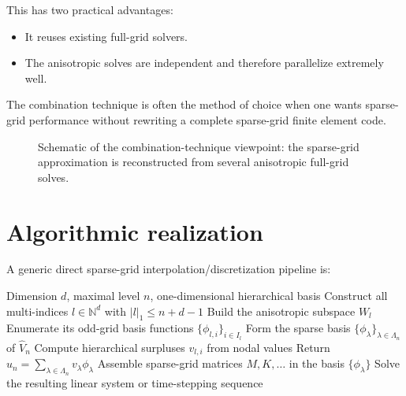 \documentclass[11pt,a4paper]{report}
\begin{document}
This has two practical advantages:

\begin{itemize}
\item It reuses existing full-grid solvers.
\item The anisotropic solves are independent and therefore parallelize extremely well.
\end{itemize}

The combination technique is often the method of choice when one wants sparse-grid performance without rewriting a complete sparse-grid finite element code.

\begin{figure}[ht]
\centering
{}
\caption{Schematic of the combination-technique viewpoint: the sparse-grid approximation is reconstructed from several anisotropic full-grid solves.}
\label{fig:combination}
\end{figure}

\section{Algorithmic realization}

A generic direct sparse-grid interpolation/discretization pipeline is:

\begin{algorithm}[ht]
\caption{Classical sparse-grid construction and use}
\begin{algorithmic}[1]
\Require Dimension $d$, maximal level $n$, one-dimensional hierarchical basis
\State Construct all multi-indices $l\in\mathbb{N}^d$ with $|l|_1\le n+d-1$
  \State Build the anisotropic subspace $W_l$
  \State Enumerate its odd-grid basis functions $\{\phi_{l,i}\}_{i\in I_l}$
\EndFor
\State Form the sparse basis $\{\phi_\lambda\}_{\lambda\in\Lambda_n}$ of $\widehat V_n$
  \State Compute hierarchical surpluses $v_{l,i}$ from nodal values
  \State Return $\widehat u_n=\sum_{\lambda\in\Lambda_n} v_\lambda \phi_\lambda$
\Else
  \State Assemble sparse-grid matrices $M,K,\ldots$ in the basis $\{\phi_\lambda\}$
  \State Solve the resulting linear system or time-stepping sequence
\EndIf
\end{algorithmic}
\label{alg:sg}
\end{algorithm}
\end{document}
